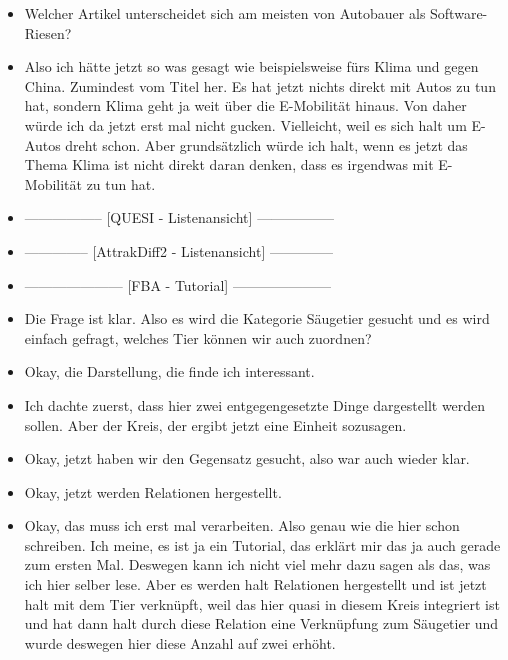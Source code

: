 {\begin{itemize}[]
    Vielleicht aus dem Gefühl heraus \flqq Auto-Bloggerin nimmt Tesla-Modell auseinander\frqq{}. 
    Einfach, weil es da wahrscheinlich sehr viel um Software gehen wird und um den Autobauer an sich.
    \item {} Welcher Artikel unterscheidet sich am meisten von \flqq Autobauer als Software-Riesen\frqq{}?
    \item {} Also ich hätte jetzt so was gesagt wie beispielsweise \flqq fürs Klima und gegen China\frqq{}. 
    Zumindest vom Titel her.
    Es hat jetzt nichts direkt mit Autos zu tun hat, sondern Klima geht ja weit über die E-Mobilität hinaus.
    Von daher würde ich da jetzt erst mal nicht gucken. 
    Vielleicht, weil es sich halt um E-Autos dreht schon. 
    Aber grundsätzlich würde ich halt, wenn es jetzt das Thema Klima ist nicht direkt daran denken, dass es irgendwas mit E-Mobilität zu tun hat.
    \item {-----------------} [QUESI - Listenansicht] {-----------------}
    \item {--------------} [AttrakDiff2 - Listenansicht] {--------------}
    \item {---------------------} [FBA - Tutorial] {---------------------}
    \item {} Die Frage ist klar. 
    Also es wird die Kategorie Säugetier gesucht und es wird einfach gefragt, welches Tier können wir auch zuordnen?
    \item {} Okay, die Darstellung, die finde ich interessant.
    \item {} Ich dachte zuerst, dass hier zwei entgegengesetzte Dinge dargestellt werden sollen. Aber der Kreis, der ergibt jetzt eine Einheit sozusagen.
    \item {} Okay, jetzt haben wir den Gegensatz gesucht, also war auch wieder klar.
    \item {} Okay, jetzt werden Relationen hergestellt.
    \item {} Okay, das muss ich erst mal verarbeiten.
    Also genau wie die hier schon schreiben.
    Ich meine, es ist ja ein Tutorial, das erklärt mir das ja auch gerade zum ersten Mal.
    Deswegen kann ich nicht viel mehr dazu sagen als das, was ich hier selber lese.
    Aber es werden halt Relationen hergestellt und ist jetzt halt mit dem Tier verknüpft, weil das hier quasi in diesem Kreis integriert ist und hat dann halt durch diese Relation eine Verknüpfung zum Säugetier und wurde deswegen hier diese Anzahl auf zwei erhöht.

\end{itemize}}
